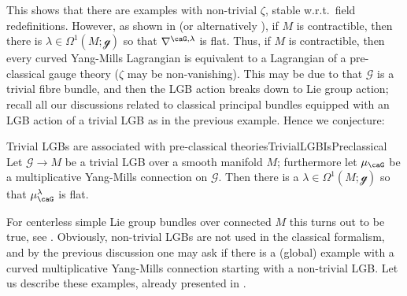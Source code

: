 \documentclass[reqno,a4paper,oneside]{amsart}
\newcommand\mutot{\mu_\caG}
\theoremstyle{plain}
\theoremstyle{remark}
\theoremstyle{definition}
\begin{document}
This shows that there are examples with non-trivial $\zeta$, stable w.r.t.\ field redefinitions. However, as shown in \cite[\S 5.2, Thm.\ 5.16]{My1stpaper} (or alternatively \cite[\S 5.1.5, Thm.\ 5.1.33]{MyThesis}), if $M$ is contractible, then there is $\lambda \in \Omega^1(M; \mathcal{g})$ so that $\nabla^{\caG, \lambda}$ is flat. Thus, if $M$ is contractible, then every curved Yang-Mills Lagrangian is equivalent to a Lagrangian of a pre-classical gauge theory ($\zeta$ may be non-vanishing). This may be due to that $\mathcal{G}$ is a trivial fibre bundle, and then the LGB action breaks down to Lie group action; recall all our discussions related to classical principal bundles equipped with an LGB action of a trivial LGB as in the previous example. 
Hence we conjecture:

\begin{conjectures}{Trivial LGBs are associated with pre-classical theories}{TrivialLGBIsPreclassical}
Let $\mathcal{G} \to M$ be a trivial LGB over a smooth manifold $M$; furthermore let $\mutot$ be a multiplicative Yang-Mills connection on $\mathcal{G}$. Then there is a $\lambda \in \Omega^1(M; \mathcal{g})$ so that $\mutot^{\lambda}$ is flat.
\end{conjectures}

For centerless simple Lie group bundles over connected $M$ this turns out to be true, see \cite{Fischer:2024vak}. Obviously, non-trivial LGBs are not used in the classical formalism, and by the previous discussion one may ask if there is a (global) example with a curved multiplicative Yang-Mills connection starting with a non-trivial LGB. Let us describe these examples, already presented in \cite{MyThesis, Fischer:2024vak}.
\end{document}
